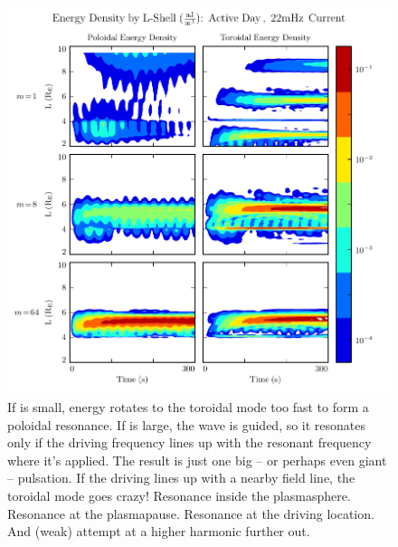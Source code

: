 


\begin{figure}[!htb]
    \centering
    \includegraphics[width=\textwidth]{figures/layers_22mHz_1.pdf}
    \caption[Poloidal and Toroidal Energy Distribution: Resonant Driving]{
      If \azm is small, energy rotates to the toroidal mode too fast to form a poloidal resonance. If \azm is large, the \Alfven wave is guided, so it resonates only if the driving frequency lines up with the resonant frequency where it's applied. The result is just one big -- or perhaps even giant -- pulsation. If the driving lines up with a nearby field line, the toroidal mode goes crazy! Resonance inside the plasmasphere. Resonance at the plasmapause. Resonance at the driving location. And (weak) attempt at a higher harmonic further out. 
    }
    \label{fig_resonant_driving}
\end{figure}

